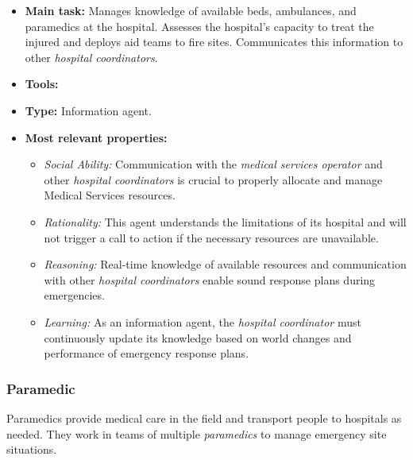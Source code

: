 \begin{itemize}
    \item \textbf{Main task:} Manages knowledge of available beds, ambulances, and paramedics at the hospital. Assesses the hospital's capacity to treat the injured and deploys aid teams to fire sites. Communicates this information to other \textit{hospital coordinators}.
    \item \textbf{Tools:}
    \item \textbf{Type:} Information agent.
    \item \textbf{Most relevant properties:}
    \begin{itemize}
        \item \textit{Social Ability:} Communication with the \textit{medical services operator} and other \textit{hospital coordinators} is crucial to properly allocate and manage Medical Services resources.
        \item \textit{Rationality:} This agent understands the limitations of its hospital and will not trigger a call to action if the necessary resources are unavailable.
        \item \textit{Reasoning:} Real-time knowledge of available resources and communication with other \textit{hospital coordinators} enable sound response plans during emergencies.
        \item \textit{Learning:} As an information agent, the \textit{hospital coordinator} must continuously update its knowledge based on world changes and performance of emergency response plans.
    \end{itemize}
\end{itemize}

\subsubsection{Paramedic}
Paramedics provide medical care in the field and transport people to hospitals as needed. They work in teams of multiple \textit{paramedics} to manage emergency site situations.

